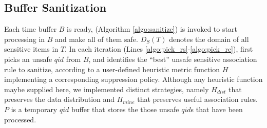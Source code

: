 \subsection{Buffer Sanitization}
\label{sec:sanitize}
Each time \qid buffer $B$ is ready, \SanitizeBuffer
(Algorithm \ref{algo:sanitize}) is invoked to start processing \qids in $B$
and make all of them safe. $D_S(T)$ denotes the domain of all sensitive
items in $T$.
In each iteration (Lines \ref{algo:pick_rs}-\ref{algo:pick_re}),
\SanitizeBuffer first picks an unsafe $qid$ from $B$,
 and identifies the ``best'' unsafe sensitive association rule
to sanitize, according to a user-defined heuristic metric function $H$
implementing a corresponding suppression policy.
Although any heuristic function maybe supplied here, 
we implemented distinct strategies, namely
$H_{dist}$ that preserves the data distribution and $H_{mine}$ that preserves
useful association rules. 
$P$ is a temporary $qid$ buffer that stores the those unsafe $qid$s that 
have been processed.

